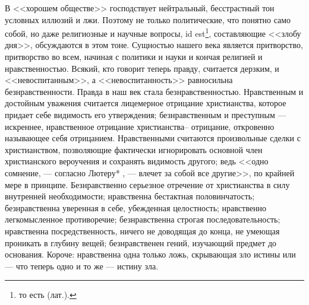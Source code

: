 \documentclass[12pt,oneside]{book}
\begin{document}
В <<хорошем обществе>> господствует нейтральный, бесстрастный тон условных иллюзий и лжи. Поэтому не только политические, что понятно само собой, но даже религиозные и научные вопросы, id est\footnote{то есть (лат.).}, составляющие <<злобу дня>>, обсуждаются в этом тоне. Сущностью нашего века является притворство, притворство во всем, начиная с политики и науки и кончая религией и нравственностью. Всякий, кто говорит теперь правду, считается дерзким, и <<невоспитанным>>, а <<невоспитанность>> равносильна безнравственности. Правда в наш век стала безнравственностью. Нравственным и достойным уважения считается лицемерное отрицание христианства, которое придает себе видимость его утверждения; безнравственным и преступным --- искреннее, нравственное отрицание христианства– отрицание, откровенно называющее себя отрицанием. Нравственными считаются произвольные сделки с христианством, позволяющие фактически игнорировать основной член христианского вероучения и сохранять видимость другого; ведь <<одно сомнение, --- согласно Лютеру*\let\svthefootnote\thefootnote
\let\thefootnote\relax{}
\let\thefootnote\svthefootnote, --- влечет за собой все другие>>, по крайней мере в принципе. Безнравственно серьезное отречение от христианства в силу внутренней необходимости; нравственна бестактная половинчатость; безнравственна уверенная в себе, убежденная целостность; нравственно легкомысленное противоречие; безнравственна строгая последовательность; нравственна посредственность, ничего не доводящая до конца, не умеющая проникать в глубину вещей; безнравственен гений, изучающий предмет до основания. Короче: нравственна одна только ложь, скрывающая зло истины или --- что теперь одно и то же --- истину зла.
\end{document}
